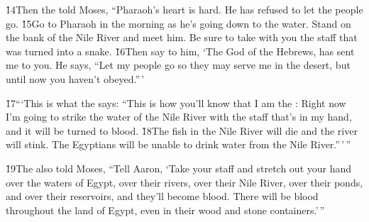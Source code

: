 \v{14}Then the  told Moses, ``Pharaoh's heart is hard. He has refused to let the people go. \v{15}Go to Pharaoh in the morning as he's going down to the water. Stand on the bank of the Nile River and meet him. Be sure to take with you the staff that was turned into a snake. \v{16}Then say to him, `The  God of the Hebrews, has sent me to you. He says, ``Let my people go so they may serve me in the desert, but until now you haven't obeyed.''\,'

\v{17}```This is what the  says: ``This is how you'll know that I am the : Right now I'm going to strike the water of the Nile River with the staff that's in my hand, and it will be turned to blood. \v{18}The fish in the Nile River will die and the river will stink. The Egyptians will be unable to drink water from the Nile River.''\,'\,''

\v{19}The  also told Moses, ``Tell Aaron, `Take your staff and stretch out your hand over the waters of Egypt, over their rivers, over their Nile River, over their ponds, and over their reservoirs, and they'll become blood. There will be blood throughout the land of Egypt, even in their wood and stone containers.'\,''

